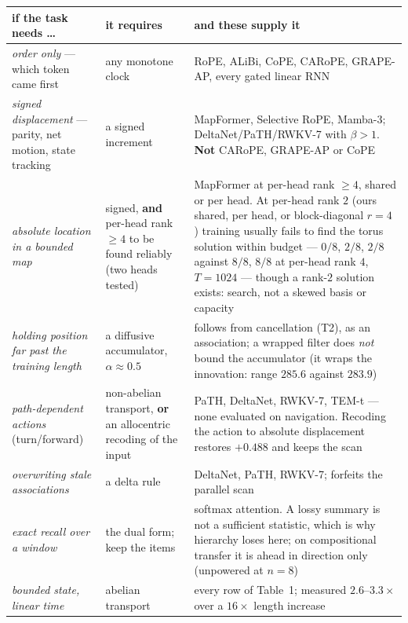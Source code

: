 \documentclass[11pt]{article}
\begin{document}
\begin{center}\small
\begin{tabular}{@{}p{4.0cm}p{3.4cm}p{6.6cm}@{}}
\toprule
if the task needs \dots & it requires & and these supply it \\
\midrule
\emph{order only} --- which token came first & any monotone clock & RoPE, ALiBi, CoPE, CARoPE, GRAPE-AP, every gated linear RNN \\[3pt]
\emph{signed displacement} --- parity, net motion, state tracking & a signed increment & MapFormer, Selective RoPE, Mamba-3; DeltaNet/PaTH/RWKV-7 with $\beta>1$. \textbf{Not} CARoPE, GRAPE-AP or CoPE \\[3pt]
\emph{absolute location in a bounded map} & signed, \textbf{and} per-head rank $\ge4$ to be found reliably (two heads tested) & MapFormer at per-head rank $\ge4$, shared or per head. At per-head rank $2$ (ours shared, per head, or block-diagonal $r=4$) training usually fails to find the torus solution within budget --- $0/8$, $2/8$, $2/8$ against $8/8$, $8/8$ at per-head rank $4$, $T{=}1024$ --- though a rank-$2$ solution exists: search, not a skewed basis or capacity \\[3pt]
\emph{holding position far past the training length} & a diffusive accumulator, $\alpha\approx0.5$ & follows from cancellation (T2), as an association; a wrapped filter does \emph{not} bound the accumulator (it wraps the innovation: range $285.6$ against $283.9$) \\[3pt]
\emph{path-dependent actions} (turn/forward) & non-abelian transport, \textbf{or} an allocentric recoding of the input & PaTH, DeltaNet, RWKV-7, TEM-t --- none evaluated on navigation. Recoding the action to absolute displacement restores $+0.488$ and keeps the scan \\[3pt]
\emph{overwriting stale associations} & a delta rule & DeltaNet, PaTH, RWKV-7; forfeits the parallel scan \\[3pt]
\emph{exact recall over a window} & the dual form; keep the items & softmax attention. A lossy summary is not a sufficient statistic, which is why hierarchy loses here; on compositional transfer it is ahead in direction only (unpowered at $n=8$) \\[3pt]
\emph{bounded state, linear time} & abelian transport & every row of Table~1; measured $2.6$--$3.3\times$ over a $16\times$ length increase \\
\bottomrule
\end{tabular}
\end{center}
\end{document}
